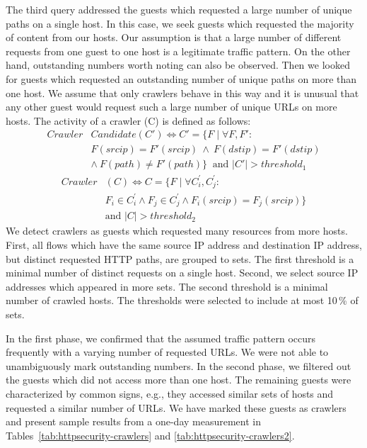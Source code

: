 The third query addressed the guests which requested a large number of unique paths on a single host. In this case, we seek guests which requested the majority of content from our hosts. Our assumption is that a large number of different requests from one guest to one host is a legitimate traffic pattern. On the other hand, outstanding numbers worth noting can also be observed. Then we looked for guests which requested an outstanding number of unique paths on more than one host. We assume that only crawlers behave in this way and it is unusual that any other guest would request such a large number of unique URLs on more hosts. The activity of a crawler (C) is defined as follows:
\begin{equation*}
\begin{split}
Crawler&Candidate(C') \iff C' = \{F \mid \forall F, F':\\
&F(srcip) = F'(srcip) \: \land \: F(dstip) = F'(dstip)\\
&\land \: F(path) \neq F'(path)\} \: \mbox{ and } |C'| > threshold_1
\end{split}
\end{equation*}
\begin{equation*}
\begin{split}
Crawler&(C) \iff C = \{F \mid \forall C^\prime_i, C^\prime_j:\\
&F_i \in C^\prime_i \land F_j \in C^\prime_j \land F_i(srcip) = F_j(srcip)\}\\
&\mbox{and } |C| > threshold_2
\end{split}
\end{equation*}
We detect crawlers as guests which requested many resources from more hosts. First, all flows which have the same source IP address and destination IP address, but distinct requested HTTP paths, are grouped to sets. The first threshold is a minimal number of distinct requests on a single host. Second, we select source IP addresses which appeared in more sets. The second threshold is a minimal number of crawled hosts. The thresholds were selected to include at most 10\,\% of sets.

In the first phase, we confirmed that the assumed traffic pattern occurs frequently with a varying number of requested URLs. We were not able to unambiguously mark outstanding numbers. In the second phase, we filtered out the guests which did not access more than one host. The remaining guests were characterized by common signs, e.g., they accessed similar sets of hosts and requested a similar number of URLs. We have marked these guests as crawlers and present sample results from a one-day measurement in Tables~\ref{tab:httpsecurity-crawlers} and \ref{tab:httpsecurity-crawlers2}.

